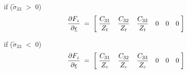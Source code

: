 \documentclass[12pt,a4paper,twoside,openright]{report}
\begin{document}
if ($\tilde{\sigma}_{33}$ $>$ 0)
$$
\frac{\partial F_{z}}{\partial \underline{\epsilon}} \; = \; 
\begin{bmatrix}
\;\mathlarger{\frac{C_{31}}{Z_{t}} }  & \mathlarger{\frac{C_{32}}{Z_{t}} } & \mathlarger{\frac{C_{33}}{Z_{t}}}  & \mathlarger{0} & \mathlarger{0}  & \mathlarger{0} \; \\
 \end{bmatrix}
$$

if ($\tilde{\sigma}_{33}$ $<$ 0)
$$
\frac{\partial F_{z}}{\partial \underline{\epsilon}} \; = \; 
\begin{bmatrix}
\;\mathlarger{\frac{C_{31}}{Z_{c}} }  & \mathlarger{\frac{C_{32}}{Z_{c}} } & \mathlarger{\frac{C_{33}}{Z_{c}}}  & \mathlarger{0} & \mathlarger{0}  & \mathlarger{0} \; \\
 \end{bmatrix}
$$



\end{document}
